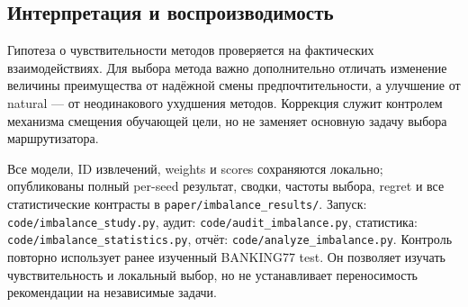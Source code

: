 \subsection{Интерпретация и воспроизводимость}
Гипотеза о чувствительности методов проверяется на фактических
взаимодействиях. Для выбора метода важно дополнительно отличать
изменение величины преимущества от надёжной смены предпочтительности,
а улучшение от natural --- от неодинакового ухудшения методов.
Коррекция служит контролем механизма смещения обучающей цели,
но не заменяет основную задачу выбора маршрутизатора.

Все модели, ID извлечений, weights и scores сохраняются локально;
опубликованы полный per-seed результат, сводки, частоты выбора,
regret и все статистические контрасты в
\texttt{paper/imbalance\_results/}. Запуск:
\texttt{code/imbalance\_study.py}, аудит:
\texttt{code/audit\_imbalance.py}, статистика:
\texttt{code/imbalance\_statistics.py}, отчёт:
\texttt{code/analyze\_imbalance.py}. Контроль повторно использует
ранее изученный BANKING77 test. Он позволяет изучать чувствительность
и локальный выбор, но не устанавливает переносимость рекомендации
на независимые задачи.
